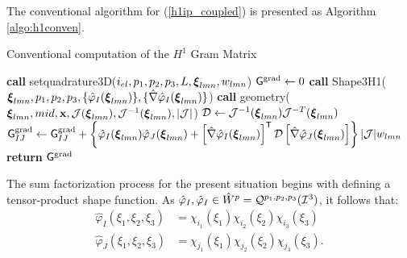 The conventional algorithm for (\ref{h1ip_coupled}) is presented as Algorithm \ref{algo:h1conven}.
% 
\begin{algorithm}[ht]
\caption{Conventional computation of the $H^1$ Gram Matrix}\label{algo:h1conven}
\begin{algorithmic}
\State\textbf{call }setquadrature3D($i_{el},p_1,p_2,p_3,L,\boldsymbol{\xi}_{lmn},w_{lmn}$)
\State $\mathsf{G}^{\operatorname{grad}} \gets 0$
            \State\textbf{call } Shape3H1($\boldsymbol{\xi}_{lmn},p_1,p_2,p_3,\{\hat{\varphi}_I(\boldsymbol{\xi}_{lmn})\},\{\hat{\nabla}\hat{\varphi}_I(\boldsymbol{\xi}_{lmn})\}$)
            \State\textbf{call } geometry( $\boldsymbol{\xi}_{lmn},mid,\mathbf{x},\mathcal{J}(\boldsymbol{\xi}_{lmn}),\mathcal{J}^{-1}(\boldsymbol{\xi}_{lmn}),|\mathcal{J}|$)
            \State $\mathcal{D}\gets\mathcal{J}^{-1}(\boldsymbol{\xi}_{lmn})\mathcal{J}^{-T}(\boldsymbol{\xi}_{lmn})$
                    \State $\mathsf{G}_{IJ}^{\operatorname{grad}} \gets \mathsf{G}_{IJ}^{\operatorname{grad}}+\left\{\hat{\varphi}_I(\boldsymbol{\xi}_{lmn})\hat{\varphi}_J(\boldsymbol{\xi}_{lmn})+\left[\hat{\nabla}\hat{\varphi}_I(\boldsymbol{\xi}_{lmn})\right]^{\mathsf{T}}\mathcal{D}\left[\hat{\nabla}\hat{\varphi}_J(\boldsymbol{\xi}_{lmn})\right]\right\}|\mathcal{J}|w_{lmn}$
                \EndFor
            \EndFor            
\EndFor
\State \textbf{return} $\mathsf{G}^{\operatorname{grad}}$
\EndProcedure
\end{algorithmic}
\end{algorithm}

The sum factorization process for the present situation begins with defining a tensor-product shape function. As $\hat{\varphi}_I,\hat{\varphi}_I\in \hat{W}^p=\mathcal{Q}^{p_1,p_2,p_3}(\mathcal{I}^3)$, it follows that:
% 
\begin{equation}
    \begin{aligned}
    \hat{\varphi}_I(\xi_1,\xi_2,\xi_3)&= \chi_{i_1}(\xi_1)\chi_{i_2}(\xi_2)\chi_{i_3}(\xi_3)\\
    \hat{\varphi}_J(\xi_1,\xi_2,\xi_3)&= \chi_{j_1}(\xi_1)\chi_{j_2}(\xi_2)\chi_{j_3}(\xi_3).
    \end{aligned}
    \label{h1tensor}
\end{equation}

